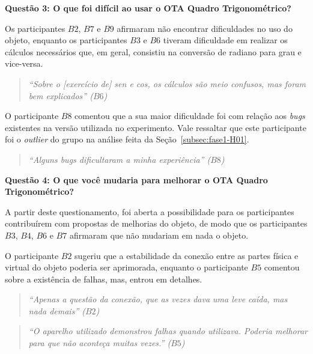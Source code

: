 \textbf{Questão 3: O que foi difícil ao usar o OTA Quadro Trigonométrico?}

Os participantes $B2$, $B7$ e $B9$ afirmaram não encontrar dificuldades no uso do objeto, enquanto os participantes $B3$ e $B6$ tiveram dificuldade em realizar os cálculos necessários que, em geral, consistiu na conversão de radiano para grau e vice-versa.

\begin{quote}
	\textit{``Sobre o [exercício de] sen e cos, os cálculos são meio confusos, mas foram bem explicados'' ($B6$)}
\end{quote}

O participante $B8$ comentou que a sua maior dificuldade foi com relação aos \textit{bugs} existentes na versão utilizada no experimento. Vale ressaltar que este participante foi o \textit{outlier} do grupo na análise feita da Seção~\ref{subsec:fase1-H01}.

\begin{quote}
	\textit{``Alguns bugs dificultaram a minha experiência'' ($B8$)}
\end{quote}



\textbf{Questão 4: O que você mudaria para melhorar o OTA Quadro Trigonométrico?}

A partir deste questionamento, foi aberta a possibilidade para os participantes contribuírem com propostas de melhorias do objeto, de modo que os participantes $B3$, $B4$, $B6$ e $B7$ afirmaram que não mudariam em nada o objeto.

O participante $B2$ sugeriu que a estabilidade da conexão entre as partes física e virtual do objeto poderia ser aprimorada, enquanto o participante $B5$ comentou sobre a existência de falhas, mas, entrou em detalhes.

\begin{quote}
	\textit{``Apenas a questão da conexão, que as vezes dava uma leve caída, mas nada demais'' ($B2$)}
\end{quote}

\begin{quote}
	\textit{``O aparelho utilizado demonstrou falhas quando utilizava. Poderia melhorar para que não aconteça muitas vezes.'' ($B5$)}
\end{quote}


